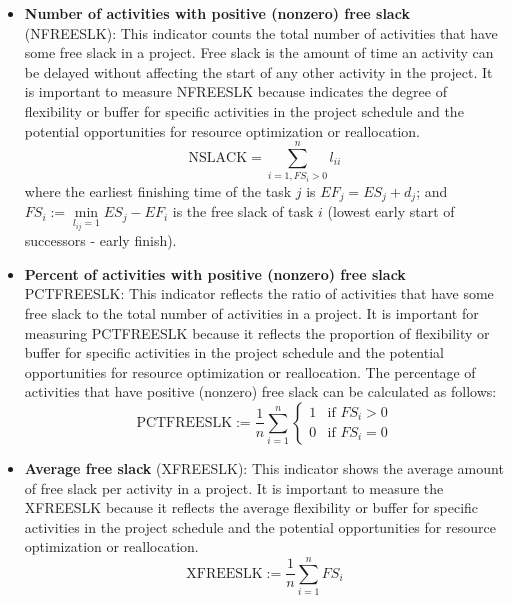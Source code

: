 \documentclass[preprint,
3p]{elsarticle} %
\begin{document}
\begin{appendices}
\begin{itemize}
  project duration and the potential opportunities for resources
  leveling or smoothing. The average slack ratio is calculated as
  \begin{equation}
  \label{eq:XSLACK_R}
  \text{XSLACK\_R}:=\frac{XSLACK}{TPT}
  \end{equation}
\item
  \textbf{Number of activities with positive (nonzero) free slack}
  (NFREESLK): This indicator counts the total number of activities that
  have some free slack in a project. Free slack is the amount of time an
  activity can be delayed without affecting the start of any other
  activity in the project. It is important to measure NFREESLK because
  indicates the degree of flexibility or buffer for specific activities
  in the project schedule and the potential opportunities for resource
  optimization or reallocation. \begin{equation}
  \label{eq:NFREESLACK}
  \text{NSLACK}=\sum_{i=1,FS_i>0}^n l_{ii}
  \end{equation} \noindent where the earliest finishing time of the task
  \(j\) is \(EF_j=ES_j+d_j\); and
  \quad \(FS_i:=\min\limits_{l_{ij}=1} ES_j-EF_i\) is the free slack of
  task \(i\) (lowest early start of successors - early finish).
\item
  \textbf{Percent of activities with positive (nonzero) free slack}
  PCTFREESLK: This indicator reflects the ratio of activities that have
  some free slack to the total number of activities in a project. It is
  important for measuring PCTFREESLK because it reflects the proportion
  of flexibility or buffer for specific activities in the project
  schedule and the potential opportunities for resource optimization or
  reallocation. The percentage of activities that have positive
  (nonzero) free slack can be calculated as follows: \begin{equation}
  \label{eq:PCTFREESLK}
  \text{PCTFREESLK}:=\frac{1}{n} \sum\limits_{i=1}^n\begin{cases} 1 & \text{if $FS_i > 0$} \\ 0 & \text{if $FS_i = 0$}\end{cases}
  \end{equation}
\item
  \textbf{Average free slack} (XFREESLK): This indicator shows the
  average amount of free slack per activity in a project. It is
  important to measure the XFREESLK because it reflects the average
  flexibility or buffer for specific activities in the project schedule
  and the potential opportunities for resource optimization or
  reallocation. \begin{equation}
  \label{eq:XFREESLK}
  \text{XFREESLK}:=\frac{1}{n} \sum\limits_{i=1}^n FS_i
  \end{equation}
\end{itemize}


\end{appendices}
\end{document}
